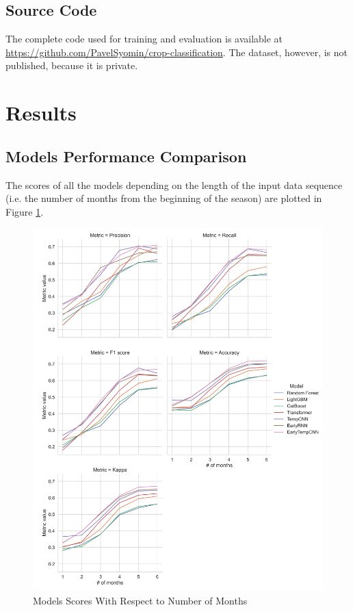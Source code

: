 \documentclass{article}
\begin{document}
 \subsection{Source Code}
 
 The complete code used for training and evaluation is available at \url{https://github.com/PavelSyomin/crop-classification}. The dataset, however, is not published, because it is private.

\section{Results}

\subsection{Models Performance Comparison}

The scores of all the models depending on the length of the input data sequence (i.e. the number of months from the beginning of the season) are plotted in Figure \ref{Figure 4.1.1}.


\begin{figure}
    \centering
    \includegraphics[width=\textwidth]{images/metrics_plot.png}
    \caption{Models Scores With Respect to Number of Months}
    \label{Figure 4.1.1}
\end{figure}
\end{document}
